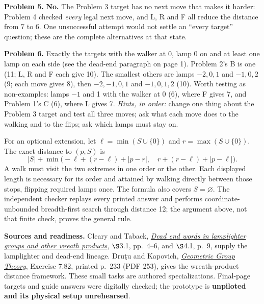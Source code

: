 \documentclass[11pt,letterpaper]{article}
\newcommand{\heading}[1]{\par\vspace{5pt}{\large\bfseries #1}\par\nobreak}
\begin{document}
\textbf{Problem 5.} \textbf{No.} The Problem 3 target has no next move that makes it harder: Problem 4 checked \emph{every} legal next move, and L, R and F all reduce the distance from 7 to 6. One unsuccessful attempt would not settle an ``every target'' question; these are the complete alternatives at that state.

\textbf{Problem 6.} Exactly the targets with the walker at 0, lamp 0 on and at least one lamp on each side (see the dead-end paragraph on page 1). Problem 2's B is one (11; L, R and F each give 10). The smallest others are lamps $-2,0,1$ and $-1,0,2$ (9; each move gives 8), then $-2,-1,0,1$ and $-1,0,1,2$ (10). Worth testing as non-examples: lamps $-1$ and 1 with the walker at 0 (6), where F gives 7, and Problem 1's C (6), where L gives 7. \emph{Hints, in order:} change one thing about the Problem 3 target and test all three moves; ask what each move does to the walking and to the flips; ask which lamps must stay on.

\heading{General rule and limits}
For an optional extension, let $\ell=\min(S\cup\{0\})$ and $r=\max(S\cup\{0\})$. The exact distance to $(p,S)$ is
\[
|S|+\min\bigl(-\ell+(r-\ell)+|p-r|,\quad r+(r-\ell)+|p-\ell|\bigr).
\]
A walk must visit the two extremes in one order or the other. Each displayed length is necessary for its order and attained by walking directly between those stops, flipping required lamps once. The formula also covers $S=\varnothing$. The independent checker replays every printed answer and performs coordinate-unbounded breadth-first search through distance 12; the argument above, not that finite check, proves the general rule.

\textbf{Sources and readiness.} Cleary and Taback, \href{https://arxiv.org/pdf/math/0309344}{\emph{Dead end words in lamplighter groups and other wreath products}}, $\S$3.1, pp.\ 4--6, and $\S$4.1, p.\ 9, supply the lamplighter and dead-end lineage. Dru\c{t}u and Kapovich, \href{https://www.math.ucdavis.edu/~kapovich/EPR/ggt.pdf}{\emph{Geometric Group Theory}}, Exercise 7.82, printed p.\ 233 (PDF 253), gives the wreath-product distance framework. These small tasks are authored specializations. Final-page targets and guide answers were digitally checked; the prototype is \textbf{unpiloted and its physical setup unrehearsed}.
\end{document}
